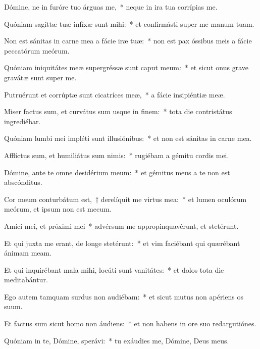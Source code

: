 \item Dómine, ne in furóre tuo árguas me,~* neque in ira tua corrípias me.

\item Quóniam sagíttæ tuæ infíxæ sunt mihi:~* et confirmásti super me manum tuam.

\item Non est sánitas in carne mea a fácie iræ tuæ:~* non est pax óssibus meis a fácie peccatórum meórum.

\item Quóniam iniquitátes meæ supergréssæ sunt caput meum:~* et sicut onus grave gravátæ sunt super me.

\item Putruérunt et corrúptæ sunt cicatríces meæ,~* a fácie insipiéntiæ meæ.

\item Miser factus sum, et curvátus sum usque in finem:~* tota die contristátus ingrediébar.

\item Quóniam lumbi mei impléti sunt illusiónibus:~* et non est sánitas in carne mea.

\item Afflíctus sum, et humiliátus sum nimis:~* rugiébam a gémitu cordis mei.

\item Dómine, ante te omne desidérium meum:~* et gémitus meus a te non est abscónditus.

\item Cor meum conturbátum est,~† derelíquit me virtus mea:~* et lumen oculórum meórum, et ipsum non est mecum.

\item Amíci mei, et próximi mei~* advérsum me appropinquavérunt, et stetérunt.

\item Et qui juxta me erant, de longe stetérunt:~* et vim faciébant qui quærébant ánimam meam.

\item Et qui inquirébant mala mihi, locúti sunt vanitátes:~* et dolos tota die meditabántur.

\item Ego autem tamquam surdus non audiébam:~* et sicut mutus non apériens os suum.

\item Et factus sum sicut homo non áudiens:~* et non habens in ore suo redargutiónes.

\item Quóniam in te, Dómine, sperávi:~* tu exáudies me, Dómine, Deus meus.

